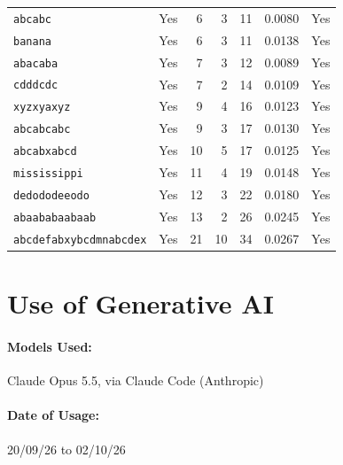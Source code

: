 \documentclass{article}
\begin{document}
\begin{table}[ht]
\begin{tabular}{l c r r r r c}
		\texttt{abcabc}                  & \textcolor{green!50!black}{Yes} &  6 & 3 & 11 & 0.0080 & \textcolor{green!50!black}{Yes} \\
		\texttt{banana}                  & \textcolor{green!50!black}{Yes} &  6 & 3 & 11 & 0.0138 & \textcolor{green!50!black}{Yes} \\
		\texttt{abacaba}                 & \textcolor{green!50!black}{Yes} &  7 & 3 & 12 & 0.0089 & \textcolor{green!50!black}{Yes} \\
		\texttt{cdddcdc}                 & \textcolor{green!50!black}{Yes} &  7 & 2 & 14 & 0.0109 & \textcolor{green!50!black}{Yes} \\
		\texttt{xyzxyaxyz}               & \textcolor{green!50!black}{Yes} &  9 & 4 & 16 & 0.0123 & \textcolor{green!50!black}{Yes} \\
		\texttt{abcabcabc}               & \textcolor{green!50!black}{Yes} &  9 & 3 & 17 & 0.0130 & \textcolor{green!50!black}{Yes} \\
		\texttt{abcabxabcd}              & \textcolor{green!50!black}{Yes} & 10 & 5 & 17 & 0.0125 & \textcolor{green!50!black}{Yes} \\
		\texttt{mississippi}             & \textcolor{green!50!black}{Yes} & 11 & 4 & 19 & 0.0148 & \textcolor{green!50!black}{Yes} \\
		\texttt{dedododeeodo}            & \textcolor{green!50!black}{Yes} & 12 & 3 & 22 & 0.0180 & \textcolor{green!50!black}{Yes} \\
		\texttt{abaababaabaab}           & \textcolor{green!50!black}{Yes} & 13 & 2 & 26 & 0.0245 & \textcolor{green!50!black}{Yes} \\
		\texttt{abcdefabxybcdmnabcdex}   & \textcolor{green!50!black}{Yes} & 21 & 10 & 34 & 0.0267 & \textcolor{green!50!black}{Yes} \\
		\bottomrule
	\end{tabular}
	\end{table}
	
	\clearpage
	\section{Use of Generative AI}
	\paragraph{Models Used:} Claude Opus 5.5, via Claude Code (Anthropic)
	\paragraph{Date of Usage:} 20/09/26 to 02/10/26
	
\end{document}

